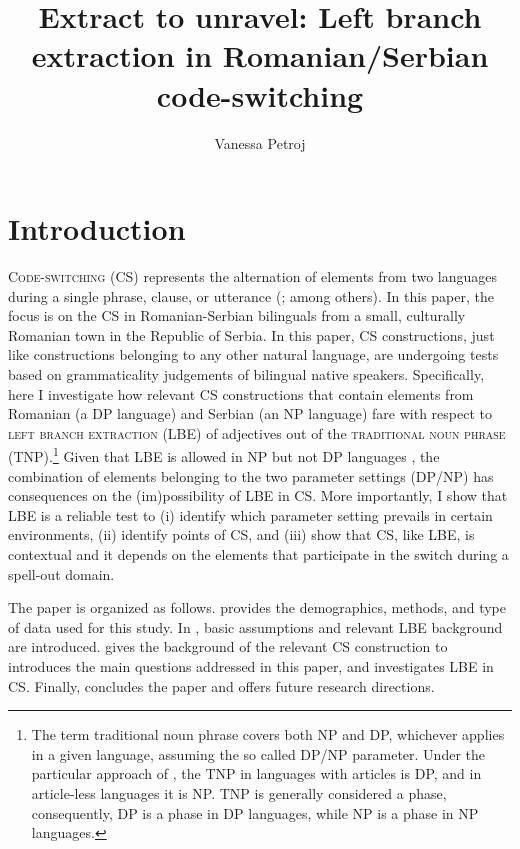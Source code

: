 \documentclass[output=paper,hidelinks,newtxmath,]{langscibook}
\title{Extract to unravel: Left branch extraction in Romanian/Serbian code-switching}
\author{Vanessa Petroj\affiliation{University of Connecticut}}
\begin{document}
\maketitle
{}

\section{Introduction}\label{15:s1}

\textsc{Code-switching} (CS) represents the alternation of elements from two languages during a single phrase, clause, or utterance (\citealt{Poplack1980,GonzalesVelasquez1995,MacSwan1999,Muysken2000}; among others). In this paper, the focus is on the CS in Romanian-Serbian bilinguals from a small, culturally Romanian town in the Republic of Serbia. In this paper, CS constructions, just like constructions belonging to any other natural language, are undergoing tests based on grammaticality judgements of bilingual native speakers. Specifically, here I investigate how relevant CS constructions that contain elements from Romanian (a DP language) and Serbian (an NP language) fare with respect to \textsc{left branch extraction} (LBE) of adjectives out of the \textsc{traditional noun phrase} (TNP).\footnote{\label{15:fn1}The term traditional noun phrase covers both NP and DP, whichever applies in a given language, assuming the so called DP/NP parameter. Under the particular approach of \citet{Boskovic2014}, the TNP in languages with articles is DP, and in article-less languages it is NP. TNP is generally considered a phase, consequently, DP is a phase in DP languages, while NP is a phase in NP languages.} Given that LBE is allowed in NP but not DP languages \citep{Uriagereka1988,Boskovic2008,Boskovic2012}, the combination of elements belonging to the two parameter settings (DP/NP) has consequences on the (im)possibility of LBE in CS. More importantly, I show that LBE is a reliable test to (i) identify which parameter setting prevails in certain environments, (ii) identify points of CS, and (iii) show that CS, like LBE, is contextual and it depends on the elements that participate in the switch during a spell-out domain.

The paper is organized as follows.  provides the demographics, methods, and type of data used for this study. In , basic assumptions and relevant LBE background are introduced.  gives the background of the relevant CS construction to introduces the main questions addressed in this paper, and  investigates LBE in CS. Finally,  concludes the paper and offers future research directions.
\end{document}
